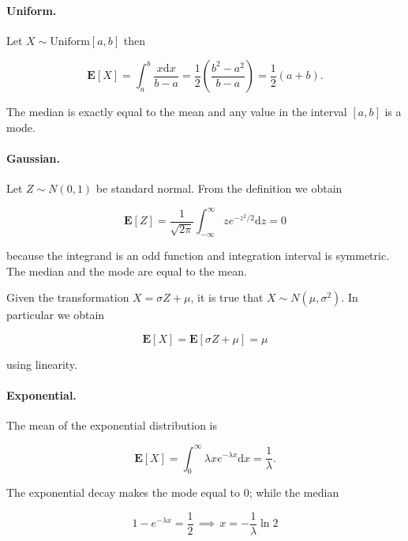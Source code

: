 \documentclass[12pt]{article}
\begin{document}
\paragraph{Uniform.}
Let $X \sim \text{Uniform}[a,b]$ then

\begin{equation}
\mathbf{E} [ X ] = 
\int_{a}^{b} \frac{ x \mathrm{d} x }{b - a} = 
\frac{1}{2} \left( \frac{b^{2} - a^{2}}{b - a} \right) = 
\frac{1}{2} ( a + b ).
\end{equation}

\noindent
The median is exactly equal to the mean and any value in the interval $[a,b]$ is 
a mode.

\paragraph{Gaussian.}
Let $Z \sim N(0,1)$ be standard normal.
From the definition we obtain

\begin{equation}
\mathbf{E} [ Z ] = \frac{1}{\sqrt{2\pi}} \int_{-\infty}^{\infty} z e^{-z^{2}/2} \mathrm{d}z = 0
\end{equation}

\noindent
because the integrand is an odd function and integration interval is symmetric.
The median and the mode are equal to the mean.

Given the transformation $X = \sigma Z + \mu$, it is true that $X \sim N(\mu, \sigma^{2})$.
In particular we obtain

\begin{equation}
\mathbf{E} [ X ] = \mathbf{E}[ \sigma Z + \mu ] = \mu
\end{equation}

\noindent
using linearity.

\paragraph{Exponential.}
The mean of the exponential distribution is

\begin{equation}
\mathbf{E} [ X ] = \int_{0}^{\infty} \lambda x e^{-\lambda x } \mathrm{d} x  = \frac{1}{\lambda}.
\end{equation}

\noindent
The exponential decay makes the mode equal to $0$; while the median 

\begin{equation}
1 - e^{-\lambda x} = \frac{1}{2} \, \implies \,
x = -\frac{1}{\lambda} \ln 2
\end{equation}
\end{document}
